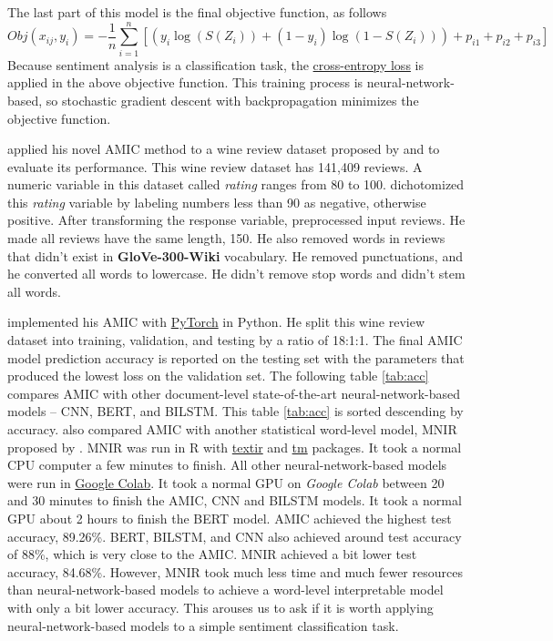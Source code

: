 \documentclass[aoas]{imsart}
\numberwithin{equation}{section}
\theoremstyle{plain}
\theoremstyle{remark}
\begin{document}
The last part of this model is the final objective function, as follows $$Obj(x_{ij}, y_i)=-\frac{1}{n}\sum_{i=1}^n\left[\left(y_i\log(S(Z_i))+(1-y_i)\log(1-S(Z_i))\right)+p_{i1}+p_{i2}+p_{i3}\right]$$ Because sentiment analysis is a classification task, the \href{https://en.wikipedia.org/wiki/Cross-entropy}{cross-entropy loss} is applied in the above objective function. This training process is neural-network-based, so stochastic gradient descent with backpropagation minimizes the objective function. 

\cite{chenyu} applied his novel AMIC method to a wine review dataset proposed by \cite{katumullage_yang_barth_cao_2022} and \cite{yang_barth_katumullage_cao_2022} to evaluate its performance. This wine review dataset has 141,409 reviews. A numeric variable in this dataset called \textit{rating} ranges from 80 to 100. \cite{chenyu} dichotomized this \textit{rating} variable by labeling numbers less than 90 as negative, otherwise positive. After transforming the response variable, \cite{chenyu} preprocessed input reviews. He made all reviews have the same length, 150. He also removed words in reviews that didn't exist in \textbf{GloVe-300-Wiki} vocabulary. He removed punctuations, and he converted all words to lowercase. He didn't remove stop words and didn't stem all words. 

\cite{chenyu} implemented his AMIC with \href{https://pytorch.org/}{PyTorch} in Python. He split this wine review dataset into training, validation, and testing by a ratio of 18:1:1. The final AMIC model prediction accuracy is reported on the testing set with the parameters that produced the lowest loss on the validation set. The following table \ref{tab:acc} compares AMIC with other document-level state-of-the-art neural-network-based models – CNN, BERT, and BILSTM. This table \ref{tab:acc} is sorted descending by accuracy. \cite{chenyu} also compared AMIC with another statistical word-level model, MNIR proposed by \cite{doi:10.1080/01621459.2012.734168}. MNIR was run in R with \href{https://cran.r-project.org/web/packages/textir/index.html}{textir} and \href{https://cran.r-project.org/web/packages/tm/vignettes/tm.pdf}{tm} packages. It took a normal CPU computer a few minutes to finish. All other neural-network-based models were run in \href{https://colab.research.google.com/}{Google Colab}. It took a normal GPU on \textit{Google Colab} between 20 and 30 minutes to finish the AMIC, CNN and BILSTM models. It took a normal GPU about 2 hours to finish the BERT model. AMIC achieved the highest test accuracy, 89.26\%. BERT, BILSTM, and CNN also achieved around test accuracy of 88\%, which is very close to the AMIC. MNIR achieved a bit lower test accuracy, 84.68\%. However, MNIR took much less time and much fewer resources than neural-network-based models to achieve a word-level interpretable model with only a bit lower accuracy. This arouses us to ask if it is worth applying neural-network-based models to a simple sentiment classification task. 
\end{document}
